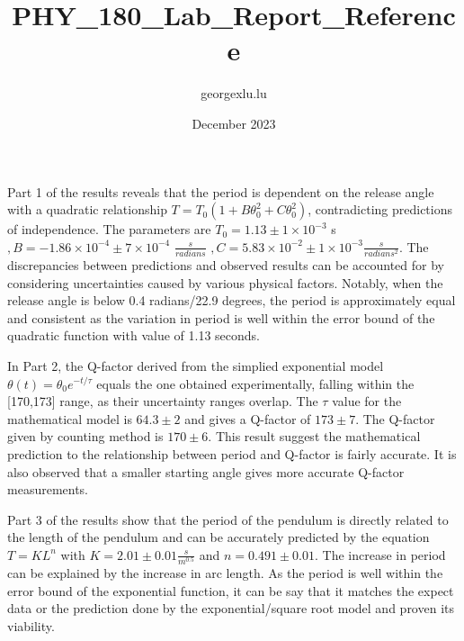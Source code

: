 \documentclass{article}
\title{PHY_180_Lab_Report_Reference}
\author{georgexlu.lu }
\date{December 2023}
\begin{document}
\section{}
\section{}
\section{}
\section{}
Part 1 of the results reveals that the period is dependent on the release angle with a quadratic relationship $T = T_0(1 + B\theta_0^2 + C\theta_0^2)$, contradicting predictions of independence. The parameters are $T_0 = 1.13  \pm 1\times10^{-3} $ s $, B = -1.86\times10^{-4}  \pm 7\times10^{-4}$ $\frac{s}{radians}$ $, C = 5.83\times10^{-2} \pm 1\times10^{-3} \frac{s}{radians^2}$. The discrepancies between predictions and observed results can be accounted for by considering uncertainties caused by various physical factors. Notably, when the release angle is below 0.4 radians/22.9 degrees, the period is approximately equal and consistent as the variation in period is well within the error bound of the quadratic function with value of 1.13 seconds.

In Part 2, the Q-factor derived from the simplied exponential model $\theta(t) = \theta_0 e^{-t/\tau}$ equals the one obtained experimentally, falling within the [170,173] range, as their uncertainty ranges overlap. The $\tau$ value for the mathematical model  is $64.3 \pm 2$ and gives a Q-factor of $173 \pm 7$. The Q-factor given by counting method is $170 \pm 6$. This result suggest the mathematical prediction to the relationship between period and Q-factor is fairly accurate. It is also observed that a smaller starting angle gives more accurate Q-factor measurements.

Part 3 of the results show that the period of the pendulum is directly related to the length of the pendulum and can be accurately predicted by the equation $T = KL^n$ with $K = 2.01 \pm 0.01\frac{s}{m^{0.5}}$ and $n = 0.491 \pm 0.01$. The increase in period can be explained by the increase in arc length. As the period is well within the error bound of the exponential function, it can be say that it matches the expect data or the prediction done by the exponential/square root model and proven its viability. 
\end{document}
